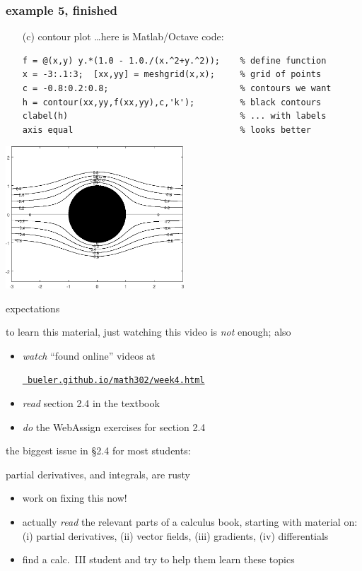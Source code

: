 \documentclass{beamer}
\begin{document}
\begin{frame}[fragile]
\frametitle{example 5, finished}

\begin{itemize}
\item[(c)] contour plot \dots here is Matlab/Octave code:
\begin{Verbatim}[fontsize=\footnotesize]
f = @(x,y) y.*(1.0 - 1.0./(x.^2+y.^2));    % define function
x = -3:.1:3;  [xx,yy] = meshgrid(x,x);     % grid of points
c = -0.8:0.2:0.8;                          % contours we want
h = contour(xx,yy,f(xx,yy),c,'k');         % black contours
clabel(h)                                  % ... with labels
axis equal                                 % looks better
\end{Verbatim}
\end{itemize}

\begin{center}
\includegraphics[width=0.5\textwidth]{figs/streamcyl-labeled}
\end{center}
\end{frame}


\begin{frame}{expectations}

to learn this material, just watching this video is \emph{not} enough; also
\begin{itemize}
\item \emph{watch} ``found online'' videos at

\centerline{\href{https://bueler.github.io/math302/week4.html}{\tt \color{cyan} bueler.github.io/math302/week4.html}}
\item \emph{read} section 2.4 in the textbook
\item \emph{do} the WebAssign exercises for section 2.4
\end{itemize}

\bigskip
\alert{the biggest issue in \S 2.4 for most students:}

\centerline{partial derivatives, and integrals, are rusty}

\begin{itemize}
\item work on fixing this now!
\item actually \emph{read} the relevant parts of a calculus book, starting with material on: (i) partial derivatives, (ii) vector fields, (iii) gradients, (iv) differentials
\item find a calc.~III student and try to help them learn these topics
\end{itemize}
\end{frame}
\end{document}
